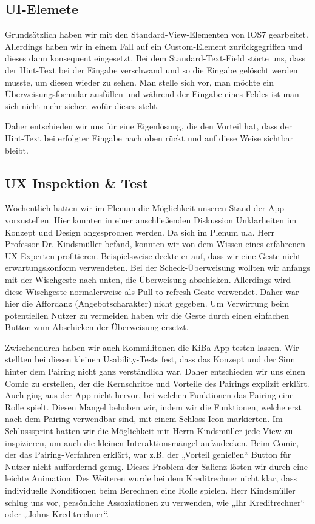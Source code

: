 \subsection{UI-Elemete}
	Grundsätzlich haben wir mit den Standard-View-Elementen von IOS7 gearbeitet. Allerdings haben wir in einem Fall auf ein Custom-Element zurückgegriffen und dieses dann konsequent eingesetzt. Bei dem Standard-Text-Field störte uns, dass der Hint-Text bei der Eingabe verschwand und so die Eingabe gelöscht werden musste, um diesen wieder zu sehen. Man stelle sich vor, man möchte ein Überweisungsformular ausfüllen und während der Eingabe eines Feldes ist man sich nicht mehr sicher, wofür dieses steht. 

	Daher entschieden wir uns für eine Eigenlösung, die den Vorteil hat, dass der Hint-Text bei erfolgter Eingabe nach oben rückt und auf diese Weise sichtbar bleibt. 

\subsection{UX Inspektion \& Test}
	Wöchentlich hatten wir im Plenum die Möglichkeit unseren Stand der App vorzustellen. Hier konnten in einer anschließenden Diskussion Unklarheiten im Konzept und Design angesprochen werden. Da sich im Plenum u.a. Herr Professor Dr. Kindsmüller befand, konnten wir von dem Wissen eines erfahrenen UX Experten profitieren. Beispielsweise deckte er auf, dass wir eine Geste nicht erwartungskonform verwendeten. Bei der Scheck-Überweisung wollten wir anfangs mit der Wischgeste nach unten, die Überweisung abschicken. Allerdings wird diese Wischgeste normalerweise als Pull-to-refresh-Geste verwendet. Daher war hier die Affordanz (Angebotscharakter) nicht gegeben. Um Verwirrung beim potentiellen Nutzer zu vermeiden haben wir die Geste durch einen einfachen Button zum Abschicken der Überweisung ersetzt.

	Zwischendurch haben wir auch Kommilitonen die KiBa-App testen lassen. Wir stellten bei diesen kleinen Usability-Tests fest, dass das Konzept und der Sinn hinter dem Pairing nicht ganz verständlich war. Daher entschieden wir uns einen Comic zu erstellen, der die Kernschritte und Vorteile des Pairings explizit erklärt. Auch ging aus der App nicht hervor, bei welchen Funktionen das Pairing eine Rolle spielt.  Diesen Mangel behoben wir, indem wir die Funktionen, welche erst nach dem Pairing verwendbar sind, mit einem Schloss-Icon markierten. Im Schlusssprint hatten wir die Möglichkeit mit Herrn Kindsmüller jede View zu inspizieren, um auch die kleinen Interaktionsmängel aufzudecken. Beim Comic, der das Pairing-Verfahren erklärt, war z.B. der „Vorteil genießen“ Button für Nutzer nicht auffordernd genug. Dieses Problem der Salienz lösten wir durch eine leichte Animation. Des Weiteren wurde bei dem Kreditrechner nicht klar, dass individuelle Konditionen beim Berechnen eine Rolle spielen. Herr Kindsmüller schlug uns vor, persönliche Assoziationen zu verwenden, wie „Ihr  Kreditrechner“ oder „Johns Kreditrechner“.

